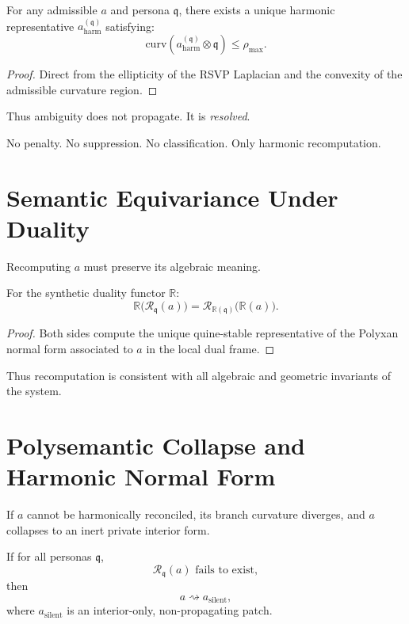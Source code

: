 \begin{lemma}
For any admissible $a$ and persona $\mathfrak{q}$,
there exists a unique harmonic representative $a^{(\mathfrak{q})}_{\mathrm{harm}}$
satisfying:
\[
\mathrm{curv}(a^{(\mathfrak{q})}_{\mathrm{harm}} \otimes \mathfrak{q})
\le \rho_{\max}.
\]
\end{lemma}

\begin{proof}
Direct from the ellipticity of the RSVP Laplacian and the convexity of the admissible curvature region.
\end{proof}

Thus ambiguity does not propagate.
It is \emph{resolved}.

No penalty.  
No suppression.  
No classification.  
Only harmonic recomputation.

\section{Semantic Equivariance Under Duality}

Recomputing $a$ must preserve its algebraic meaning.

\begin{theorem}
For the synthetic duality functor $\mathbb{R}$:
\[
\mathbb{R}\bigl(
\mathcal{R}_{\mathfrak{q}}(a)
\bigr)
=
\mathcal{R}_{\mathbb{R}(\mathfrak{q})}
\bigl(
\mathbb{R}(a)
\bigr).
\]
\end{theorem}

\begin{proof}
Both sides compute the unique quine-stable representative
of the Polyxan normal form associated to $a$ in the local dual frame.
\end{proof}

Thus recomputation is consistent with all algebraic and geometric invariants of the system.

\section{Polysemantic Collapse and Harmonic Normal Form}

If $a$ cannot be harmonically reconciled,
its branch curvature diverges,
and $a$ collapses to an inert private interior form.

\begin{theorem}
If for all personas $\mathfrak{q}$,
\[
\mathcal{R}_{\mathfrak{q}}(a)
\text{ fails to exist},
\]
then
\[
a \rightsquigarrow a_{\mathrm{silent}},
\]
where $a_{\mathrm{silent}}$ is an interior-only, non-propagating patch.
\end{theorem}

